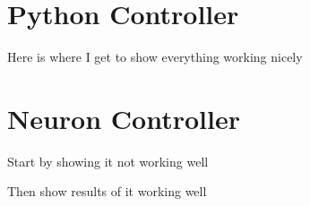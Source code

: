 \section{Python Controller}

Here is where I get to show everything working nicely


\section{Neuron Controller}

Start by showing it not working well

Then show results of it working well
